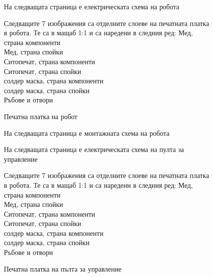\begin{figure}[H]
    \centering
    \caption{На следващата страница е електрическата схема на робота }
    \label{fig:robot-schema} 
\end{figure}



\begin{figure}[H]
    \centering
    \caption{Печатна платка на робот}
    Следващите 7 изображения са отделните слоеве на печатната платка в робота. Те са в мащаб 1:1 и са наредени в следния ред:
    Мед, страна компоненти \\
    Мед, страна спойки \\
    Ситопечат, страна компоненти \\
    Ситопечат, страна спойки \\
    солдер маска, страна компоненти\\
    солдер маска, страна спойки\\
    Ръбове и отвори 
    
    \label{fig:pcb-layout-multy-robot} 
\end{figure}









\begin{figure}[H]
    \centering
    \caption{На следващата страница е монтажната схема на робота }
    \label{fig:robot-mounting-schema} 
\end{figure}



\begin{figure}[H]
    \centering
    \caption{На следващата страница е електрическата схема на пулта за управление }
    \label{fig:controller-schema} 
\end{figure}



\begin{figure}[H]
    \centering
    \caption{Печатна платка на пълта за управление}
    Следващите 7 изображения са отделните слоеве на печатната платка в робота. Те са в мащаб 1:1 и са наредени в следния ред:
    Мед, страна компоненти \\
    Мед, страна спойки \\
    Ситопечат, страна компоненти \\
    Ситопечат, страна спойки \\
    солдер маска, страна компоненти\\
    солдер маска, страна спойки\\
    Ръбове и отвори 
    
    \label{fig:pcb-layout-multy-controller} 
\end{figure}

